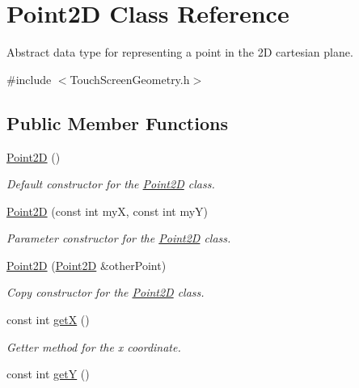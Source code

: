 \hypertarget{class_point2_d}{\section{Point2\+D Class Reference}
\label{class_point2_d}
}


Abstract data type for representing a point in the 2\+D cartesian plane.  




{\ttfamily \#include $<$Touch\+Screen\+Geometry.\+h$>$}

\subsection*{Public Member Functions}
\begin{DoxyCompactItemize}
\item 
\hypertarget{class_point2_d_a2415006d697f1c222c17254bdd302098}{\hyperlink{class_point2_d_a2415006d697f1c222c17254bdd302098}{Point2\+D} ()}\label{class_point2_d_a2415006d697f1c222c17254bdd302098}

\begin{DoxyCompactList}\small\item\em Default constructor for the \hyperlink{class_point2_d}{Point2\+D} class. \end{DoxyCompactList}\item 
\hyperlink{class_point2_d_ad20350044585163c4493994271ddbce7}{Point2\+D} (const int my\+X, const int my\+Y)
\begin{DoxyCompactList}\small\item\em Parameter constructor for the \hyperlink{class_point2_d}{Point2\+D} class. \end{DoxyCompactList}\item 
\hyperlink{class_point2_d_a9de48d5d0bd2e3978bb15f45d94930fe}{Point2\+D} (\hyperlink{class_point2_d}{Point2\+D} \&other\+Point)
\begin{DoxyCompactList}\small\item\em Copy constructor for the \hyperlink{class_point2_d}{Point2\+D} class. \end{DoxyCompactList}\item 
\hypertarget{class_point2_d_a279811adf1a9d3a4d29432f732e5aebd}{const int \hyperlink{class_point2_d_a279811adf1a9d3a4d29432f732e5aebd}{get\+X} ()}\label{class_point2_d_a279811adf1a9d3a4d29432f732e5aebd}

\begin{DoxyCompactList}\small\item\em Getter method for the x coordinate. \end{DoxyCompactList}\item 
\hypertarget{class_point2_d_aea6b4d59bfd6fe878376d076dbcdfc4d}{const int \hyperlink{class_point2_d_aea6b4d59bfd6fe878376d076dbcdfc4d}{get\+Y} ()}\label{class_point2_d_aea6b4d59bfd6fe878376d076dbcdfc4d}


\end{DoxyCompactItemize}
